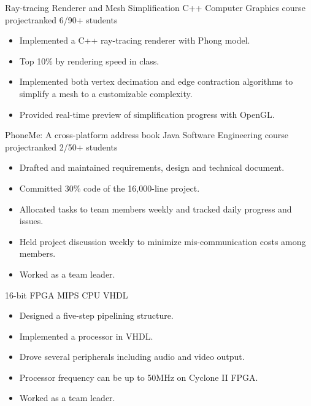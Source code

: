 \documentclass[10pt,a4paper]{moderncv/moderncv}
\begin{document}
{Ray-tracing Renderer and Mesh Simplification}
{C++}
{Computer Graphics course project}{ranked 6/90+ students}
{{
\begin{itemize}
	\item Implemented a C++ ray-tracing renderer with Phong model.
	\item Top 10\% by rendering speed in class.
	\item Implemented both vertex decimation and edge contraction algorithms to simplify a mesh to a customizable complexity.
	\item Provided real-time preview of simplification progress with OpenGL.
\end{itemize}}
}

{PhoneMe: A cross-platform address book}
{Java}
{Software Engineering course project}{ranked 2/50+ students}
{
\begin{itemize}
	\item Drafted and maintained requirements, design and technical document.
	\item Committed 30\% code of the 16,000-line project.
	\item Allocated tasks to team members weekly and tracked daily progress and issues.
	\item Held project discussion weekly to minimize mis-communication costs among members.
	\item Worked as a team leader.
\end{itemize}
}


{16-bit FPGA MIPS CPU}
{VHDL}
{}{}
{
\begin{itemize}
	\item Designed a five-step pipelining structure.
	\item Implemented a processor in VHDL.
	\item Drove several peripherals including audio and video output.
	\item Processor frequency can be up to 50MHz on Cyclone II FPGA.
	\item Worked as a team leader.	
\end{itemize}
}

\end{document}
